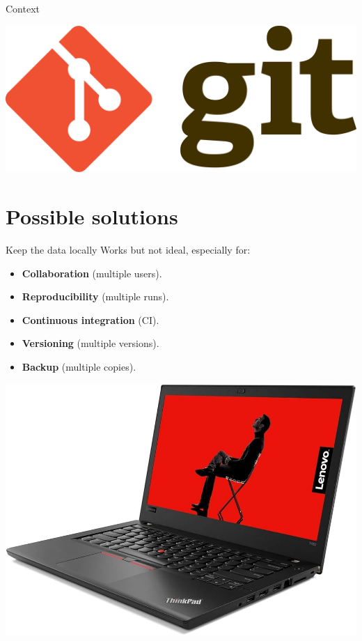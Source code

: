 \begin{frame}{Context}
\begin{center}
    \begin{minipage}{0.49\textwidth}
      \centering
      \includegraphics[width=0.8\linewidth]{images/git-logo.png}
    \end{minipage}
  \end{center}
\end{frame}

\section{Possible solutions}
\begin{frame}{Keep the data locally}
  Works but not ideal, especially for:
  \begin{center}
    \begin{minipage}{0.49\textwidth}
      \begin{itemize}
        \item \textbf{Collaboration} (multiple users).
        \item \textbf{Reproducibility} (multiple runs).
        \item \textbf{Continuous integration} (CI).
        \item \textbf{Versioning} (multiple versions).
        \item \textbf{Backup} (multiple copies).
      \end{itemize}
    \end{minipage}
    \hfill
    \begin{minipage}{0.49\textwidth}
      \centering
      \includegraphics[width=0.6\linewidth]{images/thinkpad.jpg}
    \end{minipage}
  \end{center}
\end{frame}

